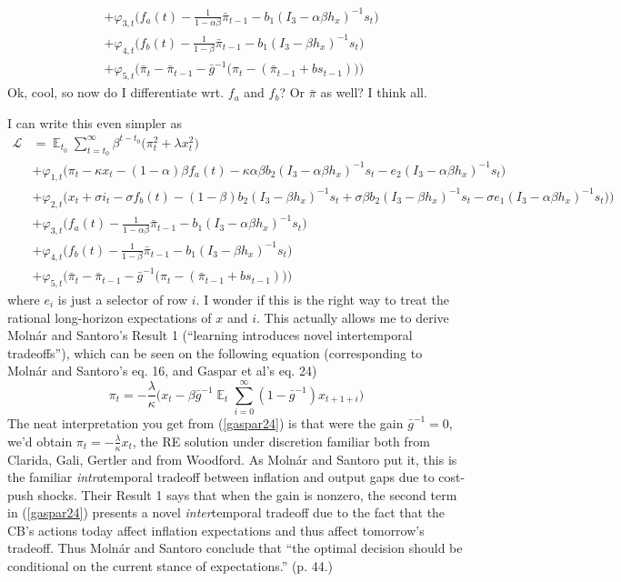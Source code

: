 \documentclass[11pt]{article}
\renewcommand{\[}{\begin{equation}}
\renewcommand{\]}{\end{equation}}
\DeclareMathOperator{\E}{\mathbb{E}}
\begin{document}
\begin{enumerate}
\begin{align}
 & +  \varphi_{3,t}  \bigg(f_a(t) - \frac{1}{1-\alpha\beta}\bar{\pi}_{t-1}  - b_1(I_3 - \alpha\beta h_x)^{-1}s_t  \bigg) \\
 & + \varphi_{4,t}  \bigg(f_b(t) - \frac{1}{1-\beta}\bar{\pi}_{t-1}  - b_1(I_3 - \beta h_x)^{-1}s_t \bigg)  \\
  & + \varphi_{5,t}  \bigg(  \bar{\pi}_{t} - \bar{\pi}_{t-1} - \bar{g}^{-1}\big(\pi_{t} -(\bar{\pi}_{t-1}+bs_{t-1}) \big)   \bigg)  
\end{align}
	Ok, cool, so now do I differentiate wrt. $f_a$ and $f_b$? Or $\bar{\pi}$ as well? I think all.

I can write this even simpler as
	\begin{align}
\mathcal{L} &= \E_{t_0}\sum_{t=t_0}^{\infty} \beta^{t-t_0}\bigg( \pi_t^2  + \lambda x_t^2 \bigg)  \\
 & + \varphi_{1,t} \bigg(\pi_t - \kappa x_t -(1-\alpha)\beta f_a(t) -\kappa\alpha\beta b_2 (I_3 - \alpha\beta h_x)^{-1}s_t - e_2(I_3 - \alpha\beta h_x)^{-1}s_t \bigg) \\
 & + \varphi_{2,t} \bigg(x_t + \sigma i_t -\sigma f_b(t)  -  (1-\beta)b_2 (I_3 - \beta h_x)^{-1}s_t + \sigma\beta b_2 (I_3 - \beta h_x)^{-1}s_t -\sigma e_1(I_3 - \alpha\beta h_x)^{-1}s_t  \big)\bigg) \\
 & +  \varphi_{3,t}  \bigg(f_a(t) - \frac{1}{1-\alpha\beta}\bar{\pi}_{t-1}  - b_1(I_3 - \alpha\beta h_x)^{-1}s_t  \bigg) \\
 & + \varphi_{4,t}  \bigg(f_b(t) - \frac{1}{1-\beta}\bar{\pi}_{t-1}  - b_1(I_3 - \beta h_x)^{-1}s_t \bigg)  \\
  & + \varphi_{5,t}  \bigg(  \bar{\pi}_{t} - \bar{\pi}_{t-1} - \bar{g}^{-1}\big(\pi_{t} -(\bar{\pi}_{t-1}+bs_{t-1}) \big)   \bigg)  
\end{align}
where $e_i$ is just a selector of row $i$. I wonder if this is the right way to treat the rational long-horizon expectations of $x$ and $i$. This actually allows me to derive Moln\'ar and Santoro's Result 1 (``learning introduces novel intertemporal tradeoffs''), which can be seen on the following equation (corresponding to Moln\'ar and Santoro's eq. 16, and Gaspar et al's eq. 24)
\begin{equation}
\pi_t = -\frac{\lambda}{\kappa}\big(x_t -\beta \bar{g}^{-1} \E_t \sum_{i=0}^{\infty}(1-\bar{g}^{-1}) x_{t+1+i}\big) \label{gaspar24}
\end{equation}
The neat interpretation you get from (\ref{gaspar24}) is that were the gain $\bar{g}^{-1} =0$, we'd obtain $\pi_t = -\frac{\lambda}{\kappa}x_t $, the RE solution under discretion familiar both from Clarida, Gali, Gertler and from Woodford. As Moln\'ar and Santoro put it, this is the familiar \emph{intra}temporal tradeoff between inflation and output gaps due to cost-push shocks. Their Result 1 says that when the gain is nonzero, the second term in (\ref{gaspar24}) presents a novel \emph{inter}temporal tradeoff due to the fact that the CB's actions today affect inflation expectations and thus affect tomorrow's tradeoff. Thus Moln\'ar and Santoro conclude that ``the optimal decision should be conditional on the current stance of expectations.'' (p. 44.) 


\end{enumerate}
\end{document}
